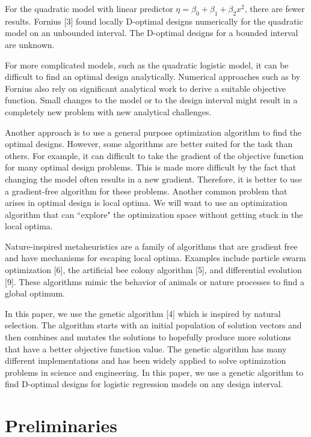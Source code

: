 \documentclass[11pt,a4paper]{article}
\begin{document}
For the quadratic model with linear predictor $\eta = \beta_0 + \beta_1 + \beta_2x^2$, there are fewer results. Fornius [3] found locally D-optimal designs numerically for the quadratic model on an unbounded interval. The D-optimal designs for a bounded interval are unknown.

For more complicated models, such as the quadratic logistic model, it can be difficult to find an optimal design analytically. Numerical approaches such as by Fornius also rely on significant analytical work to derive a suitable objective function. Small changes to the model or to the design interval might result in a completely new problem with new analytical challenges.

Another approach is to use a general purpose optimization algorithm to find the optimal designs. However, some algorithms are better suited for the task than others. For example, it can difficult to take the gradient of the objective function for many optimal design problems. This is made more difficult by the fact that changing the model often results in a new gradient. Therefore, it is better to use a gradient-free algorithm for these problems. Another common problem that arises in optimal design is local optima. We will want to use an optimization algorithm that can ``explore" the optimization space without getting stuck in the local optima.

Nature-inspired metaheuristics are a family of algorithms that are gradient free and have mechanisms for escaping local optima. Examples include particle swarm optimization [6], the artificial bee colony algorithm [5], and differential evolution [9]. These algorithms mimic the behavior of animals or nature processes to find a global optimum. 

In this paper, we use the genetic algorithm [4] which is inspired by natural selection. The algorithm starts with an initial population of solution vectors and then combines and mutates the solutions to hopefully produce more solutions that have a better objective function value. The genetic algorithm has many different implementations and has been widely applied to solve optimization problems in science and engineering. In this paper, we use a genetic algorithm to find D-optimal designs for  logistic regression models on any design interval.






\section{Preliminaries}
\end{document}
